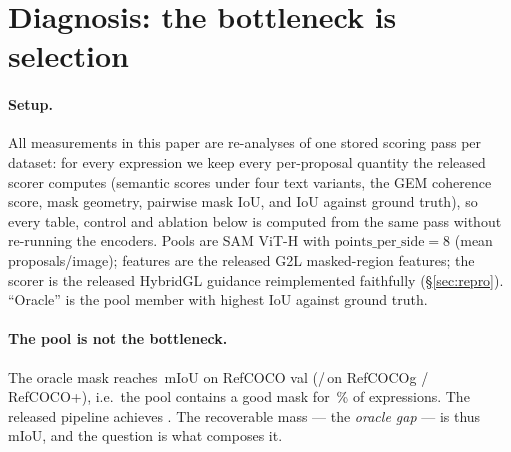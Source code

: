 \section{Diagnosis: the bottleneck is selection}
\label{sec:diagnosis}

\paragraph{Setup.}
All measurements in this paper are re-analyses of one stored scoring pass per
dataset: for every expression we keep every per-proposal quantity the
released scorer computes (semantic scores under four text variants, the GEM
coherence score, mask geometry, pairwise mask IoU, and IoU against ground
truth), so every table, control and ablation below is computed from the same
pass without re-running the encoders. Pools are SAM ViT-H with
$\text{points\_per\_side}=8$ (mean \meanPoolSize{} proposals/image);
features are the released G2L masked-region features; the scorer is the
released HybridGL guidance reimplemented faithfully
(\S\ref{sec:repro}). ``Oracle'' is the pool member with highest IoU against
ground truth.

\paragraph{The pool is not the bottleneck.}
The oracle mask reaches \oracleMIoU\,mIoU on RefCOCO val
(\oracleG/\oracleP\,on RefCOCOg / RefCOCO+), i.e.\ the pool contains a good
mask for \oracleHitPct\,\% of expressions. The released pipeline achieves
\relMIoU. The recoverable mass --- the \emph{oracle gap} --- is thus
\gapMIoU\,mIoU, and the question is what composes it.

